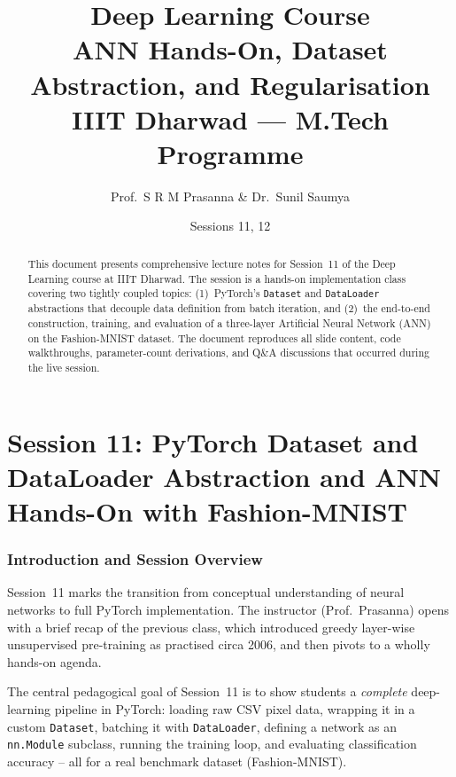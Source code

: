\documentclass[12pt,a4paper]{article}
\title{%
  {\Large\bfseries Deep Learning Course}\\[6pt]
  {\LARGE ANN Hands-On, Dataset Abstraction, and Regularisation}\\[4pt]
  {\normalsize IIIT Dharwad --- M.Tech Programme}
}
\author{Prof.\ S R M Prasanna \& Dr.\ Sunil Saumya}
\date{Sessions 11, 12}
\begin{document}
\maketitle
\tableofcontents
\clearpage

\part{Session 11: PyTorch Dataset and DataLoader Abstraction and ANN Hands-On with Fashion-MNIST}

\begin{abstract}
This document presents comprehensive lecture notes for Session~11 of the Deep
Learning course at IIIT Dharwad.  The session is a hands-on implementation
class covering two tightly coupled topics: (1)~PyTorch's \texttt{Dataset} and
\texttt{DataLoader} abstractions that decouple data definition from batch
iteration, and (2)~the end-to-end construction, training, and evaluation of a
three-layer Artificial Neural Network (ANN) on the Fashion-MNIST dataset.  The
document reproduces all slide content, code walkthroughs, parameter-count
derivations, and Q\&A discussions that occurred during the live session.
\end{abstract}

\newpage

\section{Introduction and Session Overview}
\label{sec:intro}

Session~11 marks the transition from conceptual understanding of neural
networks to full PyTorch implementation.  The instructor (Prof.\ Prasanna)
opens with a brief recap of the previous class, which introduced greedy
layer-wise unsupervised pre-training as practised circa 2006, and then pivots
to a wholly hands-on agenda.

\begin{keyinsight}
The central pedagogical goal of Session~11 is to show students a
\emph{complete} deep-learning pipeline in PyTorch: loading raw CSV pixel data,
wrapping it in a custom \texttt{Dataset}, batching it with \texttt{DataLoader},
defining a network as an \texttt{nn.Module} subclass, running the training
loop, and evaluating classification accuracy -- all for a real benchmark
dataset (Fashion-MNIST).
\end{keyinsight}
\end{document}
